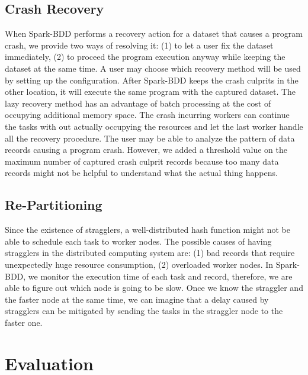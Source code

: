 \documentclass{acm_proc_article-sp}
\begin{document}
\subsection{Crash Recovery}

When Spark-BDD performs a recovery action for a dataset that causes a program crash, we provide two ways of resolving it: (1) to let a user fix the dataset immediately, (2) to proceed the program execution anyway while keeping the dataset at the same time. A user may choose which recovery method will be used by setting up the configuration. After Spark-BDD keeps the crash culprits in the other location, it will execute the same program with the captured dataset. The lazy recovery method has an advantage of batch processing at the cost of occupying additional memory space. The crash incurring workers can continue the tasks with out actually occupying the resources and let the last worker handle all the recovery procedure. The user may be able to analyze the pattern of data records causing a program crash. However, we added a threshold value on the maximum number of captured crash culprit records because too many data records might not be helpful to understand what the actual thing happens.

\subsection{Re-Partitioning}

Since the existence of stragglers, a well-distributed hash function might not be able to schedule each task to worker nodes. The possible causes of having stragglers in the distributed computing system are: (1) bad records that require unexpectedly huge resource consumption, (2) overloaded worker nodes. In Spark-BDD, we monitor the execution time of each task and record, therefore, we are able to figure out which node is going to be slow. Once we know the straggler and the faster node at the same time, we can imagine that a delay caused by stragglers can be mitigated by sending the tasks in the straggler node to the faster one. 

\section{Evaluation}
\end{document}
